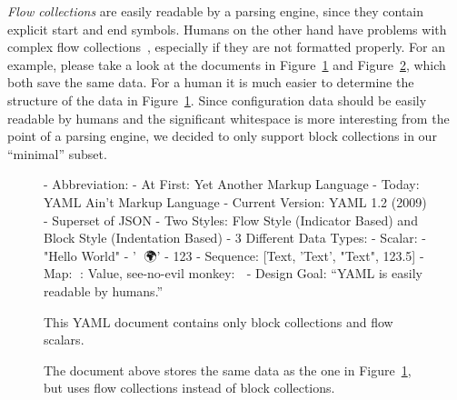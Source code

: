 \emph{Flow collections} are easily readable by a parsing engine, since they contain explicit start and end symbols. Humans on the other hand have problems with complex flow collections~\cite{connor2018flowstyle}, especially if they are not formatted properly. For an example, please take a look at the  documents in Figure~\ref{fig:block_collection} and Figure~\ref{fig:flow_collection}, which both save the same data. For a human it is much easier to determine the structure of the data in Figure~\ref{fig:block_collection}. Since configuration data should be easily readable by humans and the significant whitespace is more interesting from the point of a parsing engine, we decided to only support block collections in our “minimal”  subset.

\begin{figure}
  \begin{yamlcode}
    - Abbreviation:
       - At First: Yet Another Markup Language
       - Today: YAML Ain’t Markup Language
    - Current Version: YAML 1.2 (2009)
    - Superset of \gls{JSON}
    - Two Styles: Flow Style (Indicator Based) and
                  Block Style (Indentation Based)
    - 3 Different Data Types:
      - Scalar:
        - "Hello World"
        - '👋 🌍'
        - 123
      - Sequence: [Text, 'Text', "Text", 123.5]
      - Map: {🔑: Value, see-no-evil monkey: 🙈}
    - Design Goal: “YAML is easily readable by humans.”
  \end{yamlcode}
  \caption{This \gls{YAML} document contains only block collections and flow scalars.}
  \label{fig:block_collection}
\end{figure}

\begin{figure}
\begin{yamlcode}
\end{yamlcode}
  \caption{The  document above stores the same data as the one in Figure~\ref{fig:block_collection}, but uses flow collections instead of block collections.}
  \label{fig:flow_collection}
\end{figure}

